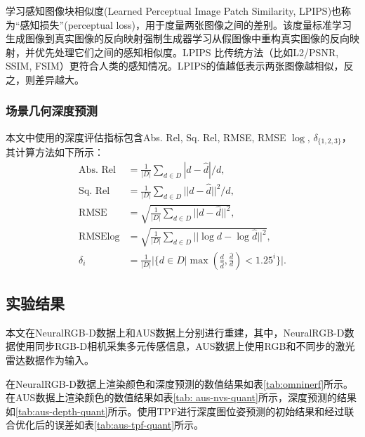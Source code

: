 学习感知图像块相似度(Learned Perceptual Image Patch Similarity, LPIPS)\cite{zhang_unreasonable_2018}也称为“感知损失”(perceptual loss)，用于度量两张图像之间的差别。该度量标准学习生成图像到真实图像的反向映射强制生成器学习从假图像中重构真实图像的反向映射，并优先处理它们之间的感知相似度。LPIPS 比传统方法（比如L2/PSNR, SSIM, FSIM）更符合人类的感知情况。LPIPS的值越低表示两张图像越相似，反之，则差异越大。

\subsubsection{场景几何深度预测}
本文中使用的深度评估指标包含Abs. Rel, Sq. Rel, RMSE, RMSE $\log$, $\delta_{\{1,2,3\}}$，其计算方法如下所示：
\begin{align}
    \text{Abs. Rel} &= \frac{1}{|D|}\sum_{d\in D} |d - \hat{d}| / d,\\
    \text{Sq. Rel} &= \frac{1}{|D|}\sum_{d\in D} ||d - \hat{d}||^2 / d,\\
    \text{RMSE} &= \sqrt{\frac{1}{|D|}\sum_{d\in D} ||d - \hat{d}||^2},\\
    \text{RMSE} \log &= \sqrt{\frac{1}{|D|}\sum_{d\in D} ||\log d - \log\hat{d}||^2},\\
    \delta_i &= \frac{1}{|D|}|\{d\in D | \max(\frac{d}{\hat{d}}, \frac{\hat{d}}{d}) < 1.25^i\}|.
\end{align}

\subsection{实验结果}
本文在NeuralRGB-D数据上和AUS数据上分别进行重建，其中，NeuralRGB-D数据使用同步RGB-D相机采集多元传感信息，AUS数据上使用RGB和不同步的激光雷达数据作为输入。

在NeuralRGB-D数据上渲染颜色和深度预测的数值结果如表\ref{tab:omninerf}所示。在AUS数据上渲染颜色的数值结果如表\ref{tab: aus-nvs-quant}所示，深度预测的结果如\ref{tab:aus-depth-quant}所示。使用TPF进行深度图位姿预测的初始结果和经过联合优化后的误差如表\ref{tab:aus-tpf-quant}所示。

\begin{table}[ht]
\centering
{}
\caption{在NeuralRGB-D数据上评估渲染颜色和深度的数值结果}
\label{tab:omninerf}
\end{table}

